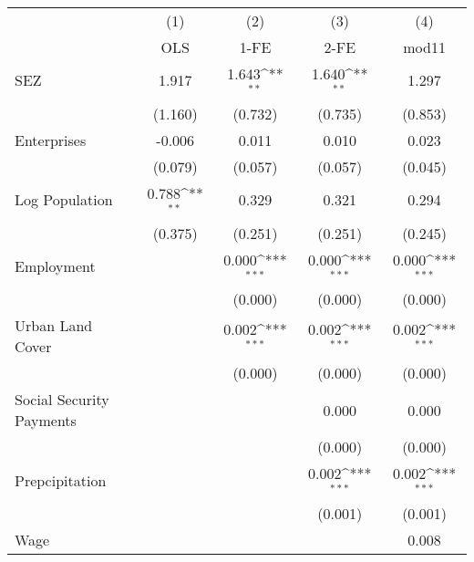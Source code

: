 {
\def\sym#1{\ifmmode^{#1}\else\(^{#1}\)\fi}
\begin{tabular}{l*{4}{c}}
\hline\hline
                    &\multicolumn{1}{c}{(1)}&\multicolumn{1}{c}{(2)}&\multicolumn{1}{c}{(3)}&\multicolumn{1}{c}{(4)}\\
                    &\multicolumn{1}{c}{OLS}&\multicolumn{1}{c}{1-FE}&\multicolumn{1}{c}{2-FE}&\multicolumn{1}{c}{mod11}\\
\hline
SEZ                 &       1.917         &       1.643\sym{**} &       1.640\sym{**} &       1.297         \\
                    &     (1.160)         &     (0.732)         &     (0.735)         &     (0.853)         \\
Enterprises         &      -0.006         &       0.011         &       0.010         &       0.023         \\
                    &     (0.079)         &     (0.057)         &     (0.057)         &     (0.045)         \\
Log Population      &       0.788\sym{**} &       0.329         &       0.321         &       0.294         \\
                    &     (0.375)         &     (0.251)         &     (0.251)         &     (0.245)         \\
Employment          &                     &       0.000\sym{***}&       0.000\sym{***}&       0.000\sym{***}\\
                    &                     &     (0.000)         &     (0.000)         &     (0.000)         \\
Urban Land Cover    &                     &       0.002\sym{***}&       0.002\sym{***}&       0.002\sym{***}\\
                    &                     &     (0.000)         &     (0.000)         &     (0.000)         \\
Social Security Payments&                     &                     &       0.000         &       0.000         \\
                    &                     &                     &     (0.000)         &     (0.000)         \\
Prepcipitation      &                     &                     &       0.002\sym{***}&       0.002\sym{***}\\
                    &                     &                     &     (0.001)         &     (0.001)         \\
Wage                &                     &                     &                     &       0.008         \\

\end{tabular}}
